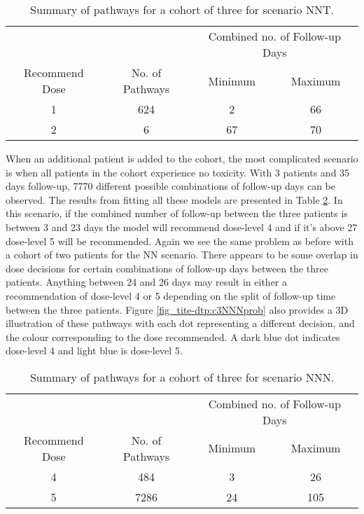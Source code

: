 \begin{table}[H]
	\centering
	\caption{Summary of pathways for a cohort of three for scenario NNT. }
	\label{tab_tite-dtp:TITEDTP_c3NNT}
	\begin{tabular}{cccc}
		\hline
		\multicolumn{1}{l}{} & \multicolumn{1}{l}{} & \multicolumn{2}{c}{Combined no. of Follow-up Days} \\ \cline{3-4} 
		Recommend Dose & No. of Pathways & Minimum & Maximum \\ \hline
		1              & 624             & 2       & 66      \\
		2              & 6               & 67      & 70      \\ \hline
	\end{tabular}
\end{table}

When an additional patient is added to the cohort, the most complicated scenario is when all patients in the cohort experience no toxicity. With 3 patients and 35 days follow-up, 7770 different possible combinations of follow-up days can be observed. The results from fitting all these models are presented in Table \ref{tab_tite-dtp:TITEDTP_c3NNN}. In this scenario, if the combined number of follow-up between the three patients is between 3 and 23 days the model will recommend dose-level 4 and if it's above 27 dose-level 5 will be recommended. Again we see the same problem as before with a cohort of two patients for the NN scenario. There appears to be some overlap in dose decisions for certain combinations of follow-up days between the three patients. Anything between 24 and 26 days may result in either a recommendation of dose-level 4 or 5 depending on the split of follow-up time between the three patients. Figure \ref{fig_tite-dtp:c3NNNprob} also provides a 3D illustration of these pathways with each dot representing a different decision, and the colour corresponding to the dose recommended. A dark blue dot indicates dose-level 4 and light blue is dose-level 5.  

\begin{table}[H]
	\centering
	\caption{Summary of pathways for a cohort of three for scenario NNN. }
	\label{tab_tite-dtp:TITEDTP_c3NNN}
	\begin{tabular}{cccc}
		\hline
		\multicolumn{1}{l}{} & \multicolumn{1}{l}{} & \multicolumn{2}{c}{Combined no. of Follow-up Days} \\ \cline{3-4} 
		Recommend Dose & No. of Pathways & Minimum & Maximum \\ \hline
		4              & 484             & 3       & 26      \\
		5              & 7286            & 24      & 105      \\ \hline
	\end{tabular}
\end{table}

